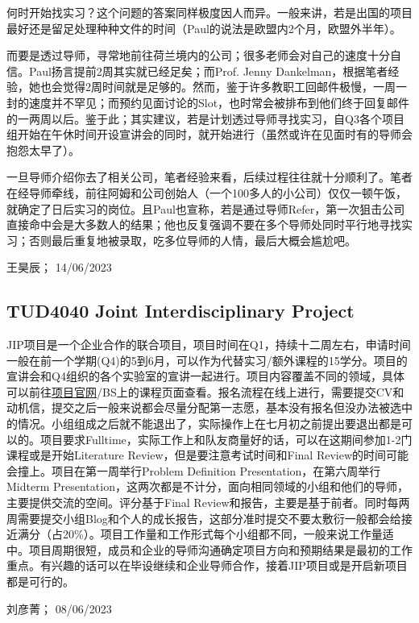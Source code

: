 何时开始找实习？这个问题的答案同样极度因人而异。一般来讲，若是出国的项目最好还是留足处理种种文件的时间（Paul的说法是欧盟内2个月，欧盟外半年）。

而要是透过导师，寻常地前往荷兰境内的公司；很多老师会对自己的速度十分自信。Paul扬言提前2周其实就已经足矣；而Prof. Jenny Dankelman，根据笔者经验，她也会觉得2周时间就是足够的。然而，鉴于许多教职工回邮件极慢，一周一封的速度并不罕见；而预约见面讨论的Slot，也时常会被排布到他们终于回复邮件的一两周以后。鉴于此；其实建议，若是计划透过导师寻找实习，自Q3各个项目组开始在午休时间开设宣讲会的同时，就开始进行（虽然或许在见面时有的导师会抱怨太早了）。

一旦导师介绍你去了相关公司，笔者经验来看，后续过程往往就十分顺利了。笔者在经导师牵线，前往阿姆和公司创始人（一个100多人的小公司）仅仅一顿午饭，就确定了日后实习的岗位。且Paul也宣称，若是通过导师Refer，第一次狙击公司直接命中会是大多数人的结果；他也反复强调不要在多个导师处同时平行地寻找实习；否则最后重复地被录取，吃多位导师的人情，最后大概会尴尬吧。
\begin{flushright}
王昊辰； 14/06/2023
\end{flushright}

\subsection{TUD4040 Joint Interdisciplinary Project}
JIP项目是一个企业合作的联合项目，项目时间在Q1，持续十二周左右，申请时间一般在前一个学期(Q4)的5到6月，可以作为代替实习/额外课程的15学分。项目的宣讲会和Q4组织的各个实验室的宣讲一起进行。项目内容覆盖不同的领域，具体可以前往\href{https://www.jointinterdisciplinaryproject.nl/}{\uline{项目官网}}/BS上的课程页面查看。报名流程在线上进行，需要提交CV和动机信，提交之后一般来说都会尽量分配第一志愿，基本没有报名但没办法被选中的情况。小组组成之后就不能退出了，实际操作上在七月初之前提出要退出都是可以的。项目要求Fulltime，实际工作上和队友商量好的话，可以在这期间参加1-2门课程或是开始Literature Review，但是要注意考试时间和Final Review的时间可能会撞上。项目在第一周举行Problem Definition Presentation，在第六周举行Midterm Presentation，这两次都是不计分，面向相同领域的小组和他们的导师，主要提供交流的空间。评分基于Final Review和报告，主要是基于前者。同时每两周需要提交小组Blog和个人的成长报告，这部分准时提交不要太敷衍一般都会给接近满分（占20\%）。项目工作量和工作形式每个小组都不同，一般来说工作量适中。项目周期很短，成员和企业的导师沟通确定项目方向和预期结果是最初的工作重点。有兴趣的话可以在毕设继续和企业导师合作，接着JIP项目或是开启新项目都是可行的。

\begin{flushright}
刘彦菁； 08/06/2023
\end{flushright}


